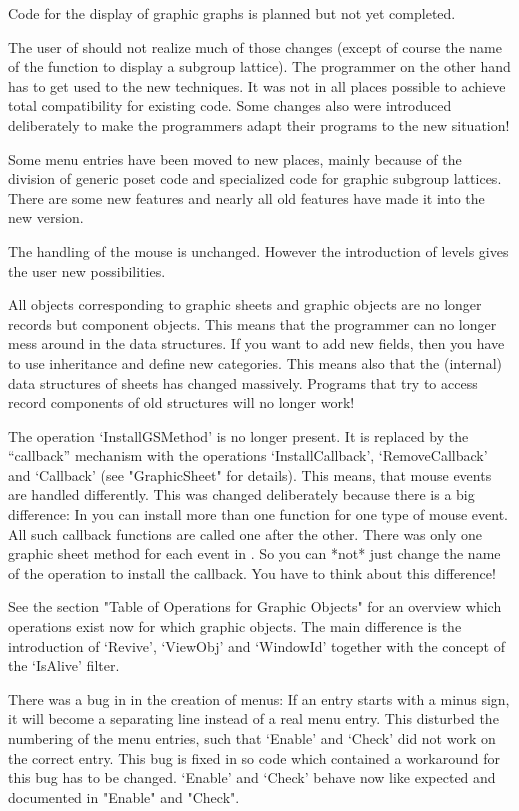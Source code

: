 Code for the display of graphic graphs is planned but not yet completed.

The user of {\XGAP} should not realize much of those changes (except of
course the name of the function to display a subgroup lattice). The
programmer on the other hand has to get used to the new techniques. It was
not in all places possible to achieve total compatibility for existing
code. Some changes also were introduced deliberately to make the
programmers adapt their programs to the new situation!



Some menu entries have been moved to new places, mainly because of the
division of generic poset code and specialized code for graphic subgroup
lattices. There are some new features and nearly all old features have made 
it into the new version.

The handling of the mouse is unchanged. However the introduction of levels
gives the user new possibilities.


All {\GAP} objects corresponding to graphic sheets and graphic objects are
no longer records but component objects. This means that the programmer can 
no longer mess around in the data structures. If you want to add new
fields, then you have to use inheritance and define new categories. This
means also that the (internal) data structures of sheets has changed
massively. Programs that try to access record components of old {\XGAP}
structures will no longer work!

The operation `InstallGSMethod' is no longer present. It is replaced by the 
``callback'' mechanism with the operations `InstallCallback',
`RemoveCallback' and `Callback' (see "GraphicSheet" for details). This
means, that mouse events are handled differently. This was changed
deliberately because there is a big difference: In {} you can install 
more than one function for one type of mouse event. All such callback
functions are called one after the other. There was only one graphic sheet
method for each event in {}. So you can *not* just change the name of 
the operation to install the callback. You have to think about this
difference! 

See the section "Table of Operations for Graphic Objects" for an overview
which operations exist now for which graphic objects. The main difference
is the introduction of `Revive', `ViewObj' and `WindowId' together with the 
concept of the `IsAlive' filter.

There was a bug in {} in the creation of menus: If an entry starts
with a minus sign, it will become a separating line instead of a real menu
entry. This disturbed the numbering of the menu entries, such that `Enable' 
and `Check' did not work on the correct entry. This bug is fixed in
{} so code which contained a workaround for this bug has to be
changed. `Enable' and `Check' behave now like expected and documented in
"Enable" and "Check".


